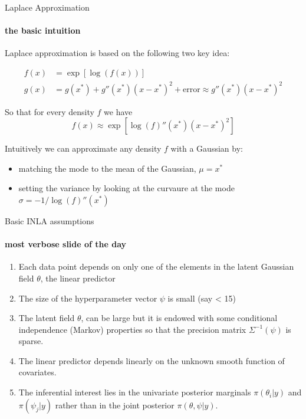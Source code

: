\documentclass[9pt,ignorenonframetext,]{beamer}
\providecommand{\tightlist}{%
  \setlength{\itemsep}{0pt}\setlength{\parskip}{0pt}}
\begin{document}
\begin{frame}{Laplace Approximation}
\protect\hypertarget{laplace-approximation}{}

\framesubtitle{the basic intuition}

Laplace approximation is based on the following two key idea:

\begin{align*}
f(x) & = \exp[\log(f(x))] \\
g(x) & = g(x^*) + g''(x^*)(x-x^*)^2 + \text{error} \approx g''(x^*)(x-x^*)^2
\end{align*}

So that for every density \(f\) we have
\[f(x) \approx \exp[\log(f)'' (x^*)(x-x^*)^2]\]

\vspace{.5cm}

\pause

Intuitively we can approximate any density \(f\) with a Gaussian by:

\begin{itemize}
\tightlist
\item
  matching the mode to the mean of the Gaussian, \(\mu = x^*\)
\item
  setting the variance by looking at the curvaure at the mode
  \(\sigma = -1/\log(f)''(x^*)\)
\end{itemize}

\end{frame}

\begin{frame}{Basic INLA assumptions}
\protect\hypertarget{basic-inla-assumptions}{}

\framesubtitle{most verbose slide of the day}

\begin{enumerate}
\item
  Each data point depends on only one of the elements in the latent
  Gaussian field \(\theta\), the linear predictor \vspace{.15cm}
\item
  The size of the hyperparameter vector \(\psi\) is small (say
  \textless{} 15) \vspace{.15cm}
\item
  The latent field \(\theta\), can be large but it is endowed with some
  conditional independence (Markov) properties so that the precision
  matrix \(\Sigma^{-1}(\psi)\) is sparse. \vspace{.15cm}
\item
  The linear predictor depends linearly on the unknown smooth function
  of covariates. \vspace{.15cm}
\item
  The inferential interest lies in the univariate posterior marginals
  \(\pi(\theta_i|y)\) and \(\pi(\psi_j|y)\) rather than in the joint
  posterior \(\pi(\theta, \psi|y)\).
\end{enumerate}

\end{frame}
\end{document}
